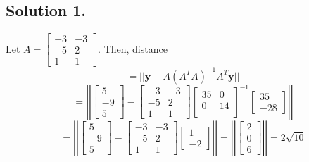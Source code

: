 \documentclass{article}
\begin{document}
\subsection*{Solution 1.}
Let $A=\left[
\begin{array}{rr}
-3 & -3 \\
-5 &  2 \\
 1 &  1
\end{array}
\right]$. Then, distance
\[=||\mathbf{y}-A(A^TA)^{-1}A^T\mathbf{y}||\]
\[=\left|\left| 
\left[\begin{array}{r}5\\-9\\5\end{array}\right]-
\left[
\begin{array}{rr}
-3 & -3 \\
-5 &  2 \\
 1 &  1
\end{array}
\right]
\left[
\begin{array}{rr}
35 &  0 \\
 0 &  14 \\
\end{array}
\right]^{-1}
\left[\begin{array}{r}35\\-28\end{array}\right]
 \right|\right|\]
 \[
=\left|\left| 
\left[\begin{array}{r}5\\-9\\5\end{array}\right]-
\left[
\begin{array}{rr}
-3 & -3 \\
-5 &  2 \\
 1 &  1
\end{array}
\right]
\left[\begin{array}{r}1\\-2\end{array}\right]
 \right|\right|
=\left|\left| 
\left[\begin{array}{r}2\\0\\6\end{array}\right]\right|\right|
=2\sqrt{10}
 \]
\end{document}
